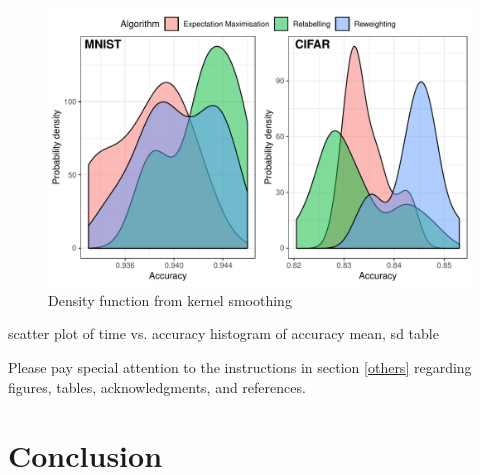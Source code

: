 \documentclass{article} %
\begin{document}
\begin{figure}    
	\includegraphics[scale=0.9]{histo.pdf}
	\caption{Density function from kernel smoothing}
	\label{fig:Density function from kernel smoothing}
\end{figure}

scatter plot of time vs. accuracy
histogram of accuracy
mean, sd table

Please pay special attention to the instructions in section \ref{others}
regarding figures, tables, acknowledgments, and references.

\section{Conclusion}
\label{headings}





\end{document}
